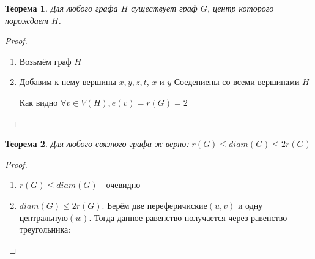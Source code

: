 \documentclass[a4paper, 12pt]{article}
\newtheorem*{theorem*}{Теорема}
\theoremstyle{definition}
\renewcommand{\leq}{\leqslant}
\begin{document}
  \begin{theorem*}
    Для любого графа $H$ существует граф $G$, центр которого порождает $H$.
  \end{theorem*}
  \begin{proof}
    \begin{enumerate}
        \item Возьмём граф $H$
        
        \item Добавим к нему вершины $x,y,z,t$, $x$ и $y$ Соедениены со всеми вершинами $H$
        

        Как видно $\forall v \in V(H), e(v)=r(G)=2$
    \end{enumerate}
  \end{proof}
  \begin{theorem*}
  Для любого связного графа ж верно: $r(G)\leq diam(G)\leq 2r(G)$
  \end{theorem*}
  \begin{proof}
    \begin{enumerate}
        \item $r(G)\leq diam(G)$ - очевидно
        \item $diam(G)\leq 2r(G)$. Берём две переферичиские$(u,v)$ и одну центральную$(w)$. Тогда данное равенство получается через равенство треугольника:
        
    \end{enumerate}
  \end{proof}
\end{document}

